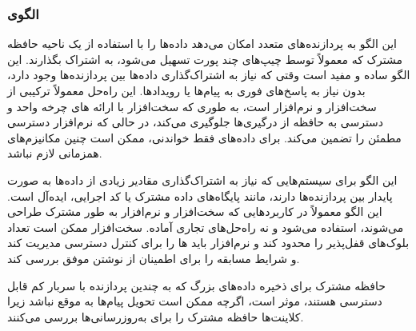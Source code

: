 \subsubsection{الگوی }
\label{distrSharedMemSec}
\begin{RTL}
این الگو به پردازنده‌های متعدد امکان می‌دهد داده‌ها را با استفاده از یک
ناحیه حافظه مشترک که معمولاً توسط چیپ‌های 
چند پورت تسهیل می‌شود، به اشتراک بگذارند. این الگو ساده و مفید است
وقتی که نیاز به اشتراک‌گذاری داده‌ها بین پردازنده‌ها وجود دارد،
بدون نیاز به پاسخ‌های فوری به پیام‌ها یا رویدادها. این راه‌حل معمولاً ترکیبی
از سخت‌افزار و نرم‌افزار است، به طوری که سخت‌افزار با ارائه های
چرخه واحد  و دسترسی به حافظه از درگیری‌ها جلوگیری می‌کند،
در حالی که نرم‌افزار دسترسی مطمئن را تضمین می‌کند.
برای داده‌های فقط خواندنی، ممکن است چنین مکانیزم‌های همزمانی لازم نباشد.
\end{RTL}
\begin{RTL}
این الگو برای سیستم‌هایی که نیاز به اشتراک‌گذاری مقادیر زیادی از داده‌ها
به صورت پایدار بین پردازنده‌ها دارند، مانند پایگاه‌های داده مشترک یا کد اجرایی،
ایده‌آل است. این الگو معمولاً در کاربردهایی که سخت‌افزار و نرم‌افزار به طور مشترک طراحی
می‌شوند، استفاده می‌شود و نه راه‌حل‌های تجاری آماده.
سخت‌افزار ممکن است تعداد بلوک‌های قفل‌پذیر را محدود کند و نرم‌افزار باید
ها را برای کنترل دسترسی مدیریت کند
و شرایط مسابقه را برای اطمینان از نوشتن موفق بررسی کند.
\end{RTL}
\begin{RTL}
حافظه مشترک برای ذخیره داده‌های بزرگ که به چندین پردازنده با سربار
کم قابل دسترسی هستند، موثر است، اگرچه ممکن است تحویل پیام‌ها
به موقع نباشد زیرا کلاینت‌ها حافظه مشترک را برای به‌روزرسانی‌ها بررسی می‌کنند.
\end{RTL}